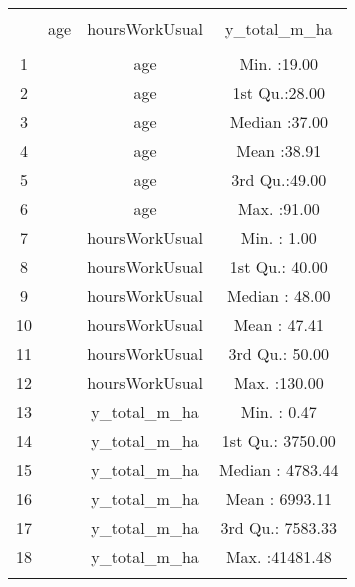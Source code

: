 
\begin{table}[!htbp] \centering 
  \caption{} 
  \label{} 
\begin{tabular}{@{\extracolsep{5pt}} cccc} 
\\[-1.8ex]\hline 
\hline \\[-1.8ex] 
 &      age & hoursWorkUsual &  y\_total\_m\_ha \\ 
\hline \\[-1.8ex] 
1 &  &      age & Min.   :19.00   \\ 
2 &  &      age & 1st Qu.:28.00   \\ 
3 &  &      age & Median :37.00   \\ 
4 &  &      age & Mean   :38.91   \\ 
5 &  &      age & 3rd Qu.:49.00   \\ 
6 &  &      age & Max.   :91.00   \\ 
7 &  & hoursWorkUsual & Min.   :  1.00   \\ 
8 &  & hoursWorkUsual & 1st Qu.: 40.00   \\ 
9 &  & hoursWorkUsual & Median : 48.00   \\ 
10 &  & hoursWorkUsual & Mean   : 47.41   \\ 
11 &  & hoursWorkUsual & 3rd Qu.: 50.00   \\ 
12 &  & hoursWorkUsual & Max.   :130.00   \\ 
13 &  &  y\_total\_m\_ha & Min.   :    0.47   \\ 
14 &  &  y\_total\_m\_ha & 1st Qu.: 3750.00   \\ 
15 &  &  y\_total\_m\_ha & Median : 4783.44   \\ 
16 &  &  y\_total\_m\_ha & Mean   : 6993.11   \\ 
17 &  &  y\_total\_m\_ha & 3rd Qu.: 7583.33   \\ 
18 &  &  y\_total\_m\_ha & Max.   :41481.48   \\ 
\hline \\[-1.8ex] 
\end{tabular} 
\end{table} 
